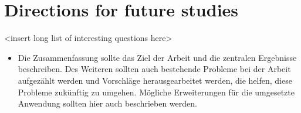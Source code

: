 
\section{Directions for future studies}
\label{sec:further-studies}
<insert long list of interesting questions here>

\begin{itemize}
	\item Die Zusammenfassung sollte das Ziel der Arbeit und die zentralen Ergebnisse beschreiben. Des Weiteren sollten auch bestehende Probleme bei der Arbeit aufgezählt werden und Vorschläge herausgearbeitet werden, die helfen, diese Probleme zukünftig zu umgehen. Mögliche Erweiterungen für die umgesetzte Anwendung sollten hier auch beschrieben werden.
\end{itemize}

\begin{comment}
In ``urgent situations'' however (how are these defined? who determines they are urgent?), discussions about a filter may happen after it was already implemented and set to warn/disallow edits without thorough testing.
Here, the filter editor responsible should monitor the filter and the logs in order to make sure the filter does what it was supposed to~\cite{Wikipedia:EditFilter}.
I think these cases should be scrutinised extra carefully since ``urgent situations'' have historically always been an excuse for cuts in civil liberties.
\end{comment}

\begin{comment}
also
* complete abuse\_filter\_history and real historical analysis: e.g. quantitative exploration of the usage and creation patterns
* access to the whole database and analysis of private filters
    -- it's possible to request access for research purposes (NDAs, ..)

\end{comment}


